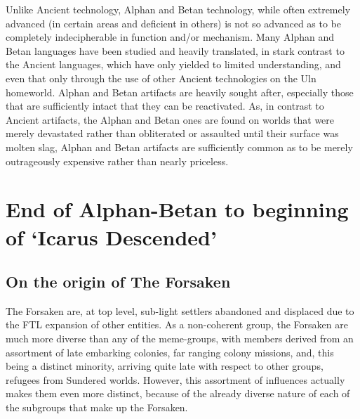 Unlike Ancient technology, Alphan and Betan technology, while often
extremely advanced (in certain areas and deficient in others) is not
so advanced as to be completely indecipherable in function and/or
mechanism. Many Alphan and Betan languages have been studied and
heavily translated, in stark contrast to the Ancient languages, which
have only yielded to limited understanding, and even that only through
the use of other Ancient technologies on the Uln
homeworld. Alphan and Betan artifacts are heavily sought
after, especially those that are sufficiently intact that they can be
reactivated. As, in contrast to Ancient artifacts, the Alphan and
Betan ones are found on worlds that were merely devastated rather than
obliterated or assaulted until their surface was molten slag, Alphan
and Betan artifacts are sufficiently common as to be merely
outrageously expensive rather than nearly priceless.

\section{End of Alphan-Betan to beginning of `Icarus Descended'}
\subsection{On the origin of The Forsaken}

The Forsaken are, at top level, sub-light settlers abandoned and
displaced due to the FTL expansion of other entities. As a
non-coherent group, the Forsaken are much more diverse than any of the
meme-groups, with members derived from an assortment of late embarking
colonies, far ranging colony missions, and, this being a distinct
minority, arriving quite late with respect to other groups, refugees
from Sundered worlds. However, this assortment of influences actually
makes them even more distinct, because of the already diverse nature
of each of the subgroups that make up the Forsaken.

